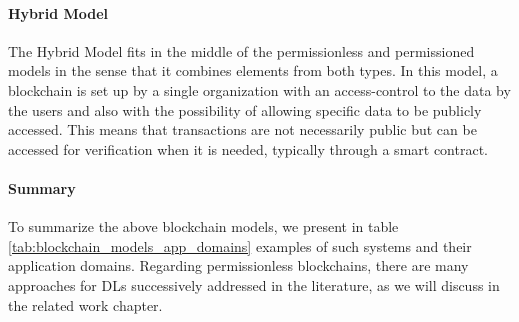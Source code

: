 \paragraph{Hybrid Model}

The Hybrid Model fits in the middle of the permissionless and permissioned models in the sense that it combines elements from both types. In this model, a blockchain is set up by a single organization with an access-control to the data by the users and also with the possibility of allowing specific data to be publicly accessed. This means that transactions are not necessarily public but can be accessed for verification when it is needed, typically through a smart contract.

\paragraph{Summary}

To summarize the above blockchain models, we present in table \ref{tab:blockchain_models_app_domains} examples of such systems and their application domains. Regarding permissionless blockchains, there are many approaches for \gls{DL}s successively addressed in the literature, as we will discuss in the related work chapter.

